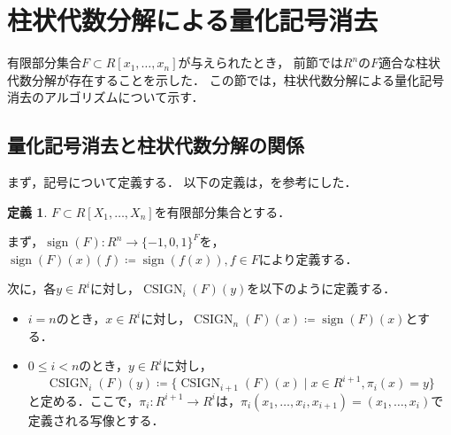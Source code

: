 \documentclass[uplatex, dvipdfmx]{jsarticle}
\numberwithin{equation}{section}
\newcommand{\R}{\mathbb{R}}
\newcommand{\map}[3]{{#1}\colon{#2}\rightarrow{#3}}
\DeclareMathOperator{\sign}{sign}
\DeclareMathOperator{\CSIGN}{CSIGN}
\theoremstyle{definition}
\newtheorem{definition}{定義}[section]
\begin{document}



\section{柱状代数分解による量化記号消去}

有限部分集合$F \subset R[x_1, \dots, x_n]$が与えられたとき，
前節では$R^n$の$F$適合な柱状代数分解が存在することを示した．
この節では，柱状代数分解による量化記号消去のアルゴリズムについて示す．

\subsection{量化記号消去と柱状代数分解の関係}
まず，記号について定義する．
以下の定義は，\cite[Notation 11.7.]{MR2248869}を参考にした．
\begin{definition}
     $F \subset R[X_1, \dots, X_n]$を有限部分集合とする．

     まず，$\map{\sign(F)}{R^n}{\{-1, 0, 1\}^F}$を，
     $\sign(F)(x)(f)\coloneqq \sign(f(x)), f \in F$により定義する．

     次に，各$y \in R^i$に対し，$\CSIGN_i(F)(y)$を以下のように定義する．
     \begin{itemize}
          \item $i=n$のとき，$x \in R^i$に対し，$\CSIGN_n(F)(x)\coloneqq \sign(F)(x) $とする．
          \item $0 \leq i<n$のとき，$y \in R^i$に対し，
          \begin{equation}
               \CSIGN_i(F)(y) \coloneqq \{\CSIGN_{i+1}(F)(x) \mid x \in  R^{i+1}, \pi_i(x) = y\}
          \end{equation}
          と定める．ここで，$\map{\pi_i}{R^{i+1}}{R^i}$は，$\pi_i(x_1, \dots, x_i, x_{i+1}) = (x_1, \dots, x_i)$で定義される写像とする．
     \end{itemize}
\end{definition}
\end{document}
